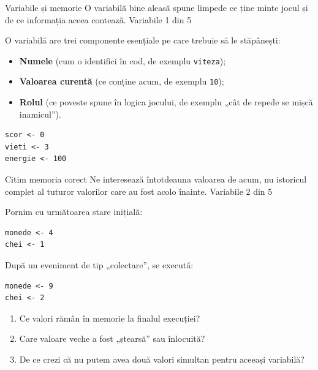 \clearpage

\PageHeader
  {Variabile și memorie}
  {O variabilă bine aleasă spune limpede ce ține minte jocul și de ce informația aceea contează.}
  {Variabile 1 din 5}

\begin{conceptbox}
O variabilă are trei componente esențiale pe care trebuie să le stăpânești:
\begin{itemize}
\item \textbf{Numele} (cum o identifici în cod, de exemplu \texttt{viteza});
\item \textbf{Valoarea curentă} (ce conține acum, de exemplu \texttt{10});
\item \textbf{Rolul} (ce poveste spune în logica jocului, de exemplu „cât de repede se mișcă inamicul”).
\end{itemize}
\end{conceptbox}

\begin{examplebox}
\begin{lstlisting}[style=codequest]
scor <- 0
vieti <- 3
energie <- 100
\end{lstlisting}
\end{examplebox}


\clearpage

\PageHeader
  {Citim memoria corect}
  {Ne interesează întotdeauna valoarea de acum, nu istoricul complet al tuturor valorilor care au fost acolo înainte.}
  {Variabile 2 din 5}

\begin{guidebox}
Pornim cu următoarea stare inițială:
\begin{lstlisting}[style=codequest]
monede <- 4
chei <- 1
\end{lstlisting}
După un eveniment de tip „colectare”, se execută:
\begin{lstlisting}[style=codequest]
monede <- 9
chei <- 2
\end{lstlisting}
\begin{enumerate}
\item Ce valori rămân în memorie la finalul execuției?
\item Care valoare veche a fost „ștearsă” sau înlocuită?
\item De ce crezi că nu putem avea două valori simultan pentru aceeași variabilă?
\end{enumerate}
\end{guidebox}

